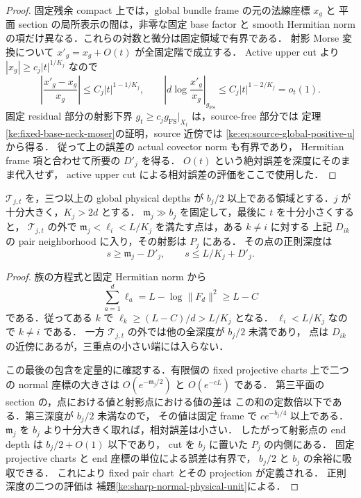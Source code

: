 \begin{proof}
固定残余 compact 上では，global bundle frame の元の法線座標 $x_g$ と
平面 section の局所表示の間は，非零な固定 base factor と smooth
Hermitian norm の項だけ異なる．これらの対数と微分は固定領域で有界である．
射影 Morse 変換について $x'_g=x_g+O(t)$ が全固定階で成立する．
Active upper cut より $|x_g|\ge c_j|t|^{1/K_j}$ なので
\[
 \left|\frac{x'_g-x_g}{x_g}\right|
       \le C_j|t|^{1-1/K_j},\qquad
 \left|d\log\frac{x'_g}{x_g}\right|_{g_{\mathrm{FS}}}
       \le C_j|t|^{1-2/K_j}=o_t(1).
\]
固定 residual 部分の射影下界
$g_t\ge c_jg_{\mathrm{FS}}|_{X_t}$ は，source-free 部分では
定理\ref{ke:fixed-base-neck-moser}の証明，source 近傍では
\eqref{ke:eq:source-global-positive-u}から得る．
従って上の誤差の actual covector norm も有界であり，
Hermitian frame 項と合わせて所要の $D'_j$ を得る．
$O(t)$ という絶対誤差を深度にそのまま代入せず，
active upper cut による相対誤差の評価をここで使用した．
\end{proof}

\begin{lemma}
\label{ke:sharp-active-pair-cover}
$\mathcal T_{j,t}$ を，三つ以上の global physical depths が
$b_j/2$ 以上である領域とする．$j$ が十分大きく，$K_j>2d$ とする．
$\mathfrak m_j\gg b_j$ を固定して，最後に $t$ を十分小さくすると，
$\mathcal T_{j,t}$ の外で
$\mathfrak m_j<\ell_i<L/K_j$ を満たす点は，ある $k\ne i$ に対する
上記 $D_{ik}$ の pair neighborhood に入り，その射影は $P_j$ にある．
その点の正則深度は
\[
 s\ge\mathfrak m_j-D'_j,\qquad s\le L/K_j+D'_j.
\]
\end{lemma}

\begin{proof}
族の方程式と固定 Hermitian norm から
\[
 \sum_{a=1}^d\ell_a=L-\log\|F_d\|^2\ge L-C
\]
である．従ってある $k$ で $\ell_k\ge(L-C)/d>L/K_j$ となる．
$\ell_i<L/K_j$ なので $k\ne i$ である．
一方 $\mathcal T_{j,t}$ の外では他の全深度が $b_j/2$ 未満であり，
点は $D_{ik}$ の近傍にあるが，三重点の小さい端には入らない．

この最後の包含を定量的に確認する．有限個の fixed projective charts
上で二つの normal 座標の大きさは
$O(e^{-\mathfrak m_j/2})$ と $O(e^{-cL})$ である．
第三平面の section の，点における値と射影点における値の差は
この和の定数倍以下である．第三深度が $b_j/2$ 未満なので，
その値は固定 frame で $c e^{-b_j/4}$ 以上である．
$\mathfrak m_j$ を $b_j$ より十分大きく取れば，相対誤差は小さい．
したがって射影点の end depth は $b_j/2+O(1)$ 以下であり，
cut を $b_j$ に置いた $P_j$ の内側にある．
固定 projective charts と end 座標の単位による誤差は有界で，
$b_j/2$ と $b_j$ の余裕に吸収できる．
これにより fixed pair chart とその projection が定義される．
正則深度の二つの評価は
補題\ref{ke:sharp-normal-physical-unit}による．
\end{proof}

